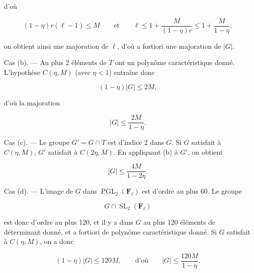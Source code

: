 \documentclass[10pt,oneside]{article}
\begin{document}
d'où\par

\begin{equation*}
(1-\eta)r(\ell-1)\leq M
\qquad\text{et}\qquad
\ell\leq1+\frac{M}{(1-\eta)r}\leq1+\frac{M}{1-\eta};
\end{equation*}

on obtient ainsi une majoration de \(\ell\), d'où a fortiori une majoration de \(|G|\).\par

Cas (b). — Au plus 2 éléments de \(T\) ont un polynôme caractéristique donné. L'hypothèse \(C(\eta,M)\) (avec \(\eta<1\)) entraîne donc\par

\begin{equation*}
(1-\eta)|G|\leq2M,
\end{equation*}

d'où la majoration\par

\begin{equation*}
|G|\leq\frac{2M}{1-\eta}.
\end{equation*}

Cas (c). — Le groupe \(G'=G\cap T\) est d'indice 2 dans \(G\). Si \(G\) satisfait à \(C(\eta,M)\), \(G'\) satisfait à \(C(2\eta,M)\). En appliquant (b) à \(G'\), on obtient\par

\begin{equation*}
|G|\leq\frac{4M}{1-2\eta}.
\end{equation*}

Cas (d). — L'image de \(G\) dans \(\operatorname{PGL}_2(\mathbf F_\ell)\) est d'ordre au plus 60. Le groupe\par

\begin{equation*}
G\cap\operatorname{SL}_2(\mathbf F_\ell)
\end{equation*}

est donc d'ordre au plus 120, et il y a dans \(G\) au plus 120 éléments de déterminant donné, et a fortiori de polynôme caractéristique donné. Si \(G\) satisfait à \(C(\eta,M)\), on a donc\par

\begin{equation*}
(1-\eta)|G|\leq120M,
\qquad\text{d'où}\qquad
|G|\leq\frac{120M}{1-\eta}.
\end{equation*}

\newpage

\end{document}
